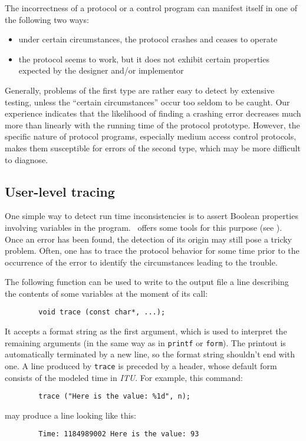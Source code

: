 The incorrectness of a protocol or a control program
can manifest itself in one of the following two ways:
\begin{itemize}
\item
under certain circumstances, the protocol crashes and ceases to operate
\item
the protocol seems to work, but it does not exhibit certain properties
expected by the designer and/or implementor
\end{itemize}

Generally, problems of the first type are rather easy to detect by extensive
testing, unless the ``certain circumstances'' occur too seldom to be caught.
Our experience indicates that the likelihood of finding a crashing error
decreases much more than linearly with the running time of the protocol
prototype.
However, the specific nature of protocol programs, especially medium access
control protocols, makes them susceptible
for errors of the second type, which may be more difficult to diagnose.

\subsection{User-level tracing}
\label{rm_ob_pt}

One simple way to detect run time inconsistencies
is to assert Boolean properties
involving variables in the program.
\smurph\ offers some tools for this purpose (see ).
Once an error has been found, the detection of its origin may still pose
a tricky problem.
Often, one has to trace the protocol behavior for some time
prior to the occurrence of the error to identify the circumstances
leading to the trouble.

The following function can be used
to write to the output file a line describing the contents
of some variables at the moment of its call:
\begin{verbatim}
        void trace (const char*, ...);
\end{verbatim}
It accepts a format string as the first argument, which
is used to interpret the remaining arguments (in the same way
as in {\tt printf} or {\tt form}).
The printout is automatically terminated by a new line, so the format string
shouldn't end with one.
A line produced by {\tt trace}
is preceded by a header, whose default form consists of the modeled time
in {\em ITU\/}.
For example, this command:
\begin{verbatim}
        trace ("Here is the value: %1d", n);
\end{verbatim}
may produce a line looking like this:
\begin{verbatim}
        Time: 1184989002 Here is the value: 93
\end{verbatim}

